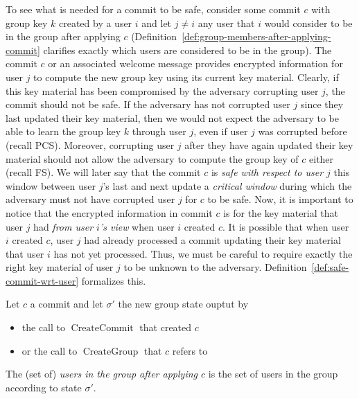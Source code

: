 To see what is needed for a commit to be safe, consider some commit $c$ with group key $k$ created by a user $i$ and let $j \neq i$ any user that $i$ would consider to be in the group after applying $c$ (Definition~\ref{def:group-members-after-applying-commit} clarifies exactly which users are considered to be in the group). The commit $c$ or an associated welcome message provides encrypted information for user $j$ to compute the new group key using its current key material. Clearly, if this key material has been compromised by the adversary corrupting user $j$, the commit should not be safe. If the adversary has not corrupted user $j$ since they last updated their key material, then we would not expect the adversary to be able to learn the group key $k$ through user $j$, even if user $j$ was corrupted before (recall PCS).
Moreover, corrupting user $j$ after they have again updated their key material should not allow the adversary to compute the group key of $c$ either (recall FS). We will later say that the commit $c$ is \emph{safe with respect to user $j$} this window between user $j$'s last and next update a \emph{critical window} during which the adversary must not have corrupted user $j$ for $c$ to be safe.
Now, it is important to notice that the encrypted information in commit $c$ is for the key material that user $j$ had \emph{from user $i$'s view} when user $i$ created $c$. It is possible that when user $i$ created $c$, user $j$ had already processed a commit updating their key material that user $i$ has not yet processed. Thus, we must be careful to require exactly the right key material of user $j$ to be unknown to the adversary. Definition~\vref{def:safe-commit-wrt-user} formalizes this.

\begin{definition} \label{def:group-members-after-applying-commit}
	Let $c$ a commit and let $\sigma'$ the new group state ouptut by
	\begin{itemize}
		\item the call to $\operatorname{CreateCommit}$ that created $c$
		\item or the call to $\operatorname{CreateGroup}$ that $c$ refers to
	\end{itemize}
	The (set of) \emph{users in the group after applying $c$} is the set of users in the group according to state $\sigma'$.
\end{definition}


